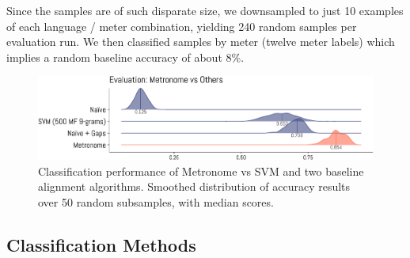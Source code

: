 \documentclass[
    hf
]{ceurart}
\begin{document}
Since the samples are of such disparate size, we downsampled to just 10 examples of each language / meter combination, yielding 240 random samples per evaluation run. We then classified samples by meter (twelve meter labels) which implies a random baseline accuracy of about 8\%.

\begin{figure}
    \includegraphics[width=\linewidth]{figures/evaluation-crop.pdf}
    \caption{Classification performance of Metronome vs SVM and two baseline alignment algorithms. Smoothed distribution of accuracy results over 50 random subsamples, with median scores.}
    \label{fig:eval}
\end{figure}

\subsection{Classification Methods}
\end{document}
